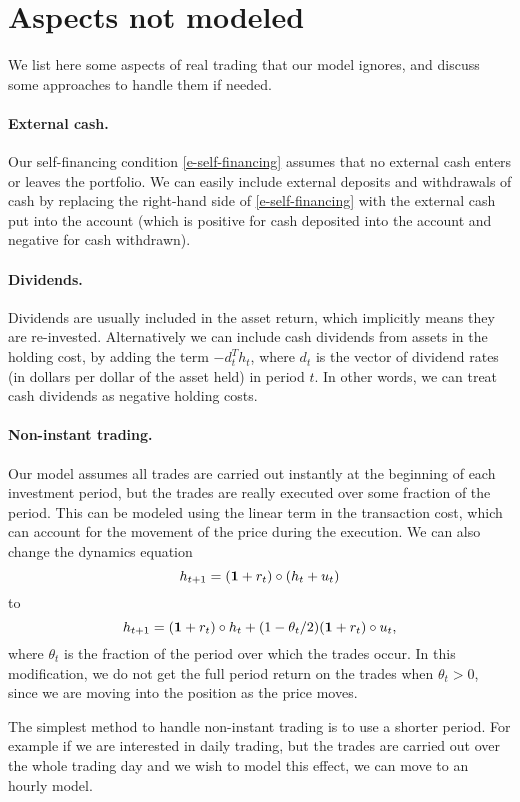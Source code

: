 \documentclass[openany]{now}
\begin{document}
\section{Aspects not modeled}

We list here some aspects of real trading that our model ignores, and discuss
some approaches to handle them if needed.

\paragraph{External cash.}  Our self-financing condition \eqref{e-self-financing}
assumes that no external cash enters or leaves the portfolio.  We can easily
include external deposits and withdrawals of cash by replacing
the right-hand side of \eqref{e-self-financing} with the external cash
put into the account (which is positive for cash deposited into the account
and negative for cash withdrawn).

\paragraph{Dividends.}  Dividends are usually included in the asset
return, which implicitly means they are re-invested.
Alternatively we can include cash dividends from assets in the
holding cost, by adding
the term $-d_t^T h_t$, where $d_t$ is the vector of dividend rates
(in dollars per dollar of the asset held) in period $t$.
In other words, we can treat cash dividends as negative holding costs.

\paragraph{Non-instant trading.} Our model assumes all trades are
carried out instantly at the beginning of each investment period,
but the trades are really executed over some fraction of the period.
This can be modeled using the linear term in the transaction
cost, which can account for the movement of the price during the
execution.
We can also change the dynamics equation
\[
h_{t+1} = (\mathbf 1 + r_t) \circ (h_t + u_t)
\]
to
\[
h_{t+1} = (\mathbf 1 + r_t) \circ h_t + (1-\theta_t/2) (\mathbf 1 + r_t)\circ u_t,
\]
where $\theta_t$ is the fraction of the period over which the trades occur.
In this modification, we do not get the full period return on the
trades when $\theta_t>0$, since we are moving into the position as the
price moves.

The simplest method to handle non-instant trading is to use a shorter
period.  For example if we are interested in daily trading, but the trades are
carried out over the whole trading day and we wish to model this effect,
we can move to an hourly model.
\end{document}
